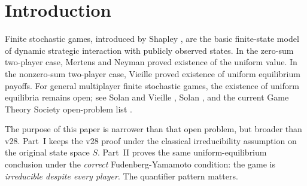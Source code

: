 \documentclass[11pt]{article}
\theoremstyle{definition}
\newcommand{\1}{\mathbf{1}}
\begin{document}
\begin{abstract}
The remaining comparison is regenerative. A cycle starts at the anchor state in work mode~$1$, contains exactly $K$ work stages, and then a return phase whose expected length is bounded independently of $K$. The unrestricted and restricted MDPs differ only on that return phase. A renewal-ratio comparison yields an $O(1/K)$ gap between the unrestricted and restricted gains, while the bias term on the augmented unichain MDP contributes the usual $O(1/T)$ term. Therefore the restricted equilibrium profile on $\Omega_K$ induces a public finite-memory strategy in the original stochastic game with regret bounded by
\[
O(1/K)+O(H(K)/T),
\]
where $H(K)$ is a bias-span constant on the augmented space and, in fact, $H(K)=O(K)$. Choosing $K$ first and then $T$ proves existence of a uniform $\varepsilon$-equilibrium under the correct Fudenberg-Yamamoto condition. The paper still does not resolve Neyman's conjecture for arbitrary finite stochastic games; it proves the theorem only under this irreducibility-despite-every-player hypothesis.
\end{abstract}

\section{Introduction}

Finite stochastic games, introduced by Shapley \cite{Shapley1953}, are the basic finite-state model of dynamic strategic interaction with publicly observed states. In the zero-sum two-player case, Mertens and Neyman \cite{MertensNeyman1981} proved existence of the uniform value. In the nonzero-sum two-player case, Vieille \cite{Vieille2000a,Vieille2000b} proved existence of uniform equilibrium payoffs. For general multiplayer finite stochastic games, the existence of uniform equilibria remains open; see Solan and Vieille \cite{SolanVieille2015}, Solan \cite{Solan2022}, and the current Game Theory Society open-problem list \cite{OpenProblems2026}.

The purpose of this paper is narrower than that open problem, but broader than v28. Part~I keeps the v28 proof under the classical irreducibility assumption on the original state space $S$. Part~II proves the same uniform-equilibrium conclusion under the \emph{correct} Fudenberg-Yamamoto condition: the game is \emph{irreducible despite every player}. The quantifier pattern matters.
\end{document}
